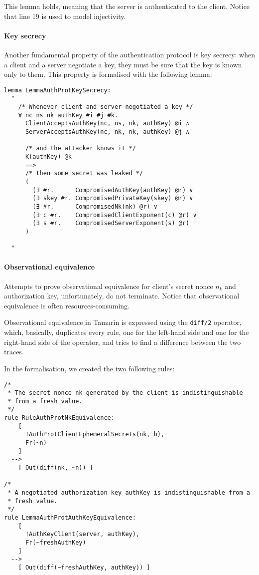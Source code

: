 This lemma holds, meaning that the server is authenticated to the client. Notice that line 19 is used to model injectivity.

\paragraph{Key secrecy}
Another fundamental property of the authentication protocol is key secrecy: when a client and a server negotiate a key, they must be sure that the key is known only to them. This property is formalised with the following lemma:
\begin{lstlisting}
lemma LemmaAuthProtKeySecrecy:
  "
    /* Whenever client and server negotiated a key */
    ∀ nc ns nk authKey #i #j #k.
      ClientAcceptsAuthKey(nc, ns, nk, authKey) @i ∧
      ServerAcceptsAuthKey(nc, nk, nk, authKey) @j ∧

      /* and the attacker knows it */
      K(authKey) @k
      ==>
      /* then some secret was leaked */
      (
        (∃ #r.      CompromisedAuthKey(authKey) @r) ∨
        (∃ skey #r. CompromisedPrivateKey(skey) @r) ∨
        (∃ #r.      CompromisedNk(nk) @r) ∨
        (∃ c #r.    CompromisedClientExponent(c) @r) ∨
        (∃ s #r.    CompromisedServerExponent(s) @r)
      )

  "
\end{lstlisting}

\paragraph{Observational equivalence}
Attempts to prove observational equivalence for client's secret nonce $n_k$ and authorization key, unfortunately, do not terminate. Notice that observational equivalence is often resources-consuming.

Observational equivalence in Tamarin is expressed using the \lstinline{diff/2} operator, which, basically, duplicates every rule, one for the left-hand side and one for the right-hand side of the operator, and tries to find a difference between the two traces.

In the formalisation, we created the two following rules:

\begin{lstlisting}
/*
 * The secret nonce nk generated by the client is indistinguishable 
 * from a fresh value.
 */
rule RuleAuthProtNkEquivalence:
    [
      !AuthProtClientEphemeralSecrets(nk, b),
      Fr(~n)
    ]
  -->
    [ Out(diff(nk, ~n)) ]

/*
 * A negotiated authorization key authKey is indistinguishable from a 
 * fresh value.
 */
rule LemmaAuthProtAuthKeyEquivalence:
    [
      !AuthKeyClient(server, authKey),
      Fr(~freshAuthKey)
    ]
  -->
    [ Out(diff(~freshAuthKey, authKey)) ]
\end{lstlisting}


